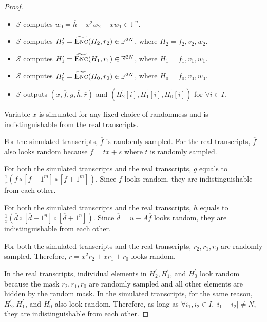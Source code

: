 \begin{proof}
\begin{itemize}
    \item $\mathcal{S}$ computes $w_0 = \overline{h} - x^2 w_2 - x w_1 \in \mathbb{F}^n$.  
    
    \item $\mathcal{S}$ computes $H_2^\prime = \widetilde{\textsc{Enc}}(H_2, r_2) \in \mathbb{F}^{2N}$, where $H_2 = f_2, v_2, w_2$.

    \item $\mathcal{S}$ computes $H_1^\prime = \widetilde{\textsc{Enc}}(H_1, r_1) \in \mathbb{F}^{2N}$, where $H_1 = f_1, v_1, w_1$.

    \item $\mathcal{S}$ computes $H_0^\prime = \widetilde{\textsc{Enc}}(H_0, r_0) \in \mathbb{F}^{2N}$, where $H_0 = f_0, v_0, w_0$.
    
    \item $\mathcal{S}$ outputs $(x, \overline{f}, \overline{g}, \overline{h}, \overline{r})$ and $(H_2^\prime[i], H_1^\prime[i], H_0^\prime[i])$ for $\forall i \in I$.
\end{itemize}

Variable $x$ is simulated for any fixed choice of randomness and is indistinguishable from the real transcripts.

For the simulated transcripts, $\overline{f}$ is randomly sampled. For the real transcripts, $\overline{f}$ also looks random because $\overline{f} = tx + s$ where $t$ is randomly sampled.

For both the simulated transcripts and the real transcripts, $\overline{g}$ equals to $\frac{1}{x} (\overline{f} \circ [\overline{f} - 1^m] \circ [\overline{f} + 1^m])$. Since $\overline{f}$ looks random, they are indistinguishable from each other.

For both the simulated transcripts and the real transcripts, $\overline{h}$ equals to $\frac{1}{x} (\overline{d} \circ [\overline{d} - 1^n] \circ [\overline{d} + 1^n])$. Since $\overline{d} = u - A\overline{f}$ looks random, they are indistinguishable from each other.

For both the simulated transcripts and the real transcripts, $r_2, r_1, r_0$ are randomly sampled. Therefore, $\overline{r} = x^2 r_2 + x r_1 + r_0$ looks random.

In the real transcripts, individual elements in $H_2^\prime, H_1^\prime$, and $H_0^\prime$ look random because the mask $r_2, r_1, r_0$ are randomly sampled and all other elements are hidden by the random mask. In the simulated transcripts, for the same reason, $H_2^\prime, H_1^\prime$, and $H_0^\prime$ also look random. Therefore, as long as $\forall i_1, i_2 \in I, |i_1 - i_2| \neq N$, they are indistinguishable from each other.
\qedsymbol{}
\end{proof}


